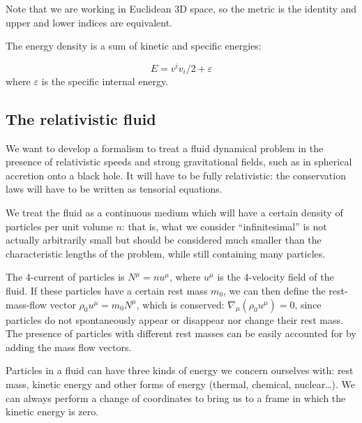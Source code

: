 \documentclass[main.tex]{subfiles}
\begin{document}
Note that we are working in Euclidean 3D space, so the metric is the identity and upper and lower indices are equivalent.

The energy density is a sum of kinetic and specific energies:

\begin{equation}
    E = v^i v_i /2 + \varepsilon
\end{equation}
where $\varepsilon$ is the specific internal energy.

\subsection{The relativistic fluid}



We want to develop a formalism to treat a fluid dynamical problem in the presence of relativistic speeds and strong gravitational fields, such as in spherical accretion onto a black hole. It will have to be fully relativistic: the conservation laws will have to be written as tensorial equations.

We treat the fluid as a continuous medium which will have a certain density of particles per unit volume $n$: that is, what we consider ``infinitesimal'' is not actually arbitrarily small but should be considered much smaller than the characteristic lengths of the problem, while still containing many particles.

The 4-current of particles is $N^\mu = n u^\mu$, where \(u^\mu\) is the 4-velocity field of the fluid.
If these particles have a certain rest mass $m_0$, we can then define the rest-mass-flow vector $\rho_0 u^\mu = m_0 N^\mu$, which is conserved: $\nabla_\mu(\rho_0 u^\mu) = 0$, since particles do not spontaneously appear or disappear nor change their rest mass.
The presence of particles with different rest masses can be easily accounted for by adding the mass flow vectors.

Particles in a fluid can have three kinds of energy we concern ourselves with: rest mass, kinetic energy and other forms of energy (thermal, chemical, nuclear\dots).
We can always perform a change of coordinates to bring us to a frame in which the kinetic energy is zero.
\end{document}
